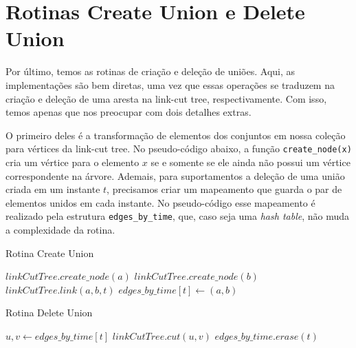 \section{Rotinas Create Union e Delete Union}
\label{sec:uf-union}

Por último, temos as rotinas de criação e deleção de uniões. Aqui, as implementações são bem diretas, uma vez que essas operações se traduzem na criação e deleção de uma aresta na link-cut tree, respectivamente. Com isso, temos apenas que nos preocupar com dois detalhes extras.

O primeiro deles é a transformação de elementos dos conjuntos em nossa coleção para vértices da link-cut tree. No pseudo-código abaixo, a função \texttt{create\_node(x)} cria um vértice para o elemento $x$ se e somente se ele ainda não possui um vértice correspondente na árvore. Ademais, para suportamentos a deleção de uma união criada em um instante $t$, precisamos criar um mapeamento que guarda o par de elementos unidos em cada instante. No pseudo-código esse mapeamento é realizado pela estrutura \texttt{edges\_by\_time}, que, caso seja uma \emph{hash table}, não muda a complexidade da rotina.

\begin{algorithm}[h!]
    \caption{Rotina Create Union}\label{uf:create-union}
    \begin{algorithmic}
        \State $linkCutTree.create\_node(a)$
        \State $linkCutTree.create\_node(b)$
        \State $linkCutTree.link(a,b,t)$
        \State $edges\_by\_time[t] \gets (a, b)$
        \EndFunction
    \end{algorithmic}
\end{algorithm}

\begin{algorithm}[h!]
    \caption{Rotina Delete Union}\label{uf:delete-union}
    \begin{algorithmic}
        \State $u,v \gets edges\_by\_time[t]$
        \State $linkCutTree.cut(u,v)$
        \State $edges\_by\_time.erase(t)$
        \EndFunction
    \end{algorithmic}
\end{algorithm}
